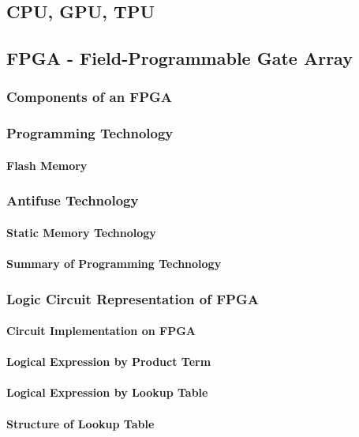 \documentclass[a4paper]{article}
\begin{document}
\subsection{CPU, GPU, TPU}
\subsection{FPGA - Field-Programmable Gate Array}
\subsubsection{Components of an FPGA}
\subsubsection{Programming Technology}
\paragraph{Flash Memory}
\subsubsection{ Antifuse Technology}
\paragraph{Static Memory Technology}
\paragraph{Summary of Programming Technology}
\subsubsection{Logic Circuit Representation of FPGA}
\paragraph{Circuit Implementation on FPGA}
\paragraph{Logical Expression by Product Term}
\paragraph{Logical Expression by Lookup Table}
\paragraph{Structure of Lookup Table}
\end{document}

